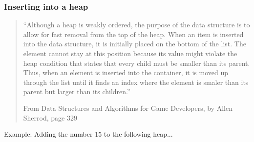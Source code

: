 \documentclass[a4paper,12pt,oneside]{book}
\begin{document}
    \subsubsection{Inserting into a heap}

        \begin{quote}
            ``Although a heap is weakly ordered, the purpose of the data structure is
            to allow for fast removal from the top of the heap. When an item is inserted
            into the data structure, it is initially placed on the bottom of the list.
            The element cannot stay at this position because its value might violate the heap condition
            that states that every child must be smaller than its parent. Thus, when an element is inserted
            into the container, it is moved up through the list until it finds an index where the
            element is smaler than its parent but larger than its children.''

            \footnotesize
            From Data Structures and Algorithms for Game Developers, by Allen Sherrod, page 329            
        \end{quote}

        \newpage

        Example: Adding the number 15 to the following heap... ~\\
    
\end{document}
